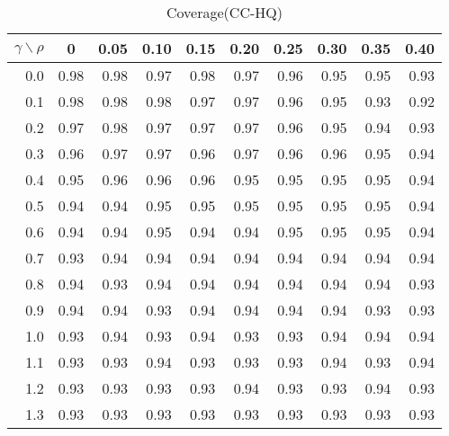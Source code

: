 \documentclass[12pt]{article}
\begin{document}
%
\begin{table}[!tbp]
\caption{Coverage(CC-HQ)}
 \begin{center}
 \begin{tabular}{r|rrrrrrrrr}\hline\hline
\multicolumn{1}{c|}{$\gamma\backslash\rho$}&\multicolumn{1}{c}{0}&\multicolumn{1}{c}{0.05}&\multicolumn{1}{c}{0.10}&\multicolumn{1}{c}{0.15}&\multicolumn{1}{c}{0.20}&\multicolumn{1}{c}{0.25}&\multicolumn{1}{c}{0.30}&\multicolumn{1}{c}{0.35}&\multicolumn{1}{c}{0.40}\tabularnewline
\hline
0.0&0.98&0.98&0.97&0.98&0.97&0.96&0.95&0.95&0.93\tabularnewline
0.1&0.98&0.98&0.98&0.97&0.97&0.96&0.95&0.93&0.92\tabularnewline
0.2&0.97&0.98&0.97&0.97&0.97&0.96&0.95&0.94&0.93\tabularnewline
0.3&0.96&0.97&0.97&0.96&0.97&0.96&0.96&0.95&0.94\tabularnewline
0.4&0.95&0.96&0.96&0.96&0.95&0.95&0.95&0.95&0.94\tabularnewline
0.5&0.94&0.94&0.95&0.95&0.95&0.95&0.95&0.95&0.94\tabularnewline
0.6&0.94&0.94&0.95&0.94&0.94&0.95&0.95&0.95&0.94\tabularnewline
0.7&0.93&0.94&0.94&0.94&0.94&0.94&0.94&0.94&0.94\tabularnewline
0.8&0.94&0.93&0.94&0.94&0.94&0.94&0.94&0.94&0.93\tabularnewline
0.9&0.94&0.94&0.93&0.94&0.94&0.94&0.94&0.93&0.93\tabularnewline
1.0&0.93&0.94&0.93&0.94&0.93&0.93&0.94&0.94&0.94\tabularnewline
1.1&0.93&0.93&0.94&0.93&0.93&0.93&0.94&0.93&0.94\tabularnewline
1.2&0.93&0.93&0.93&0.93&0.94&0.93&0.93&0.94&0.93\tabularnewline
1.3&0.93&0.93&0.93&0.93&0.93&0.93&0.93&0.93&0.93\tabularnewline
\hline
\end{tabular}

\end{center}

\end{table}
\end{document}
